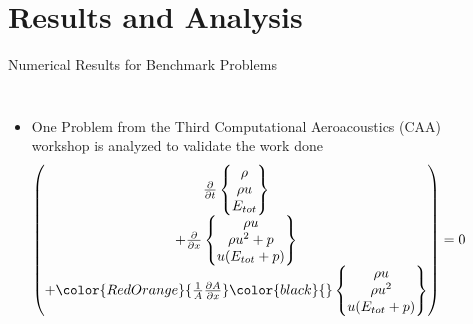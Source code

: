 \section{Results and Analysis}
\begin{frame}{Numerical Results for Benchmark Problems}
  \begin{columns}
      \begin{itemize}
        \item One Problem from the Third Computational Aeroacoustics (CAA) workshop is analyzed
              to validate the work done
        \begin{equation*}
          \left(\begin{matrix}
              \frac{\partial{}}{\partial{t}} 
              \left\{\begin{matrix}
                  \rho \\
                  \rho{u} \\
                  E_{tot}
            \end{matrix}\right\}\\
             +\frac{\partial{}}{\partial{x}}
              \left\{\begin{matrix}
                  \rho{u} \\
                  \rho{u^2}+p \\
                  u(E_{tot}+p)
            \end{matrix}\right\} \\
            +\color{RedOrange}{\frac{1}{A}\frac{\partial{A}}{\partial{x}}}\color{black}{}
              \left\{\begin{matrix}
                  \rho{u} \\
                  \rho{u^2} \\
                  u(E_{tot}+p)
            \end{matrix}\right\}
          \end{matrix}\right)= 0
        \end{equation*} 
      \end{itemize}   
      \begin{figure}[hbt!]
          \centering
          \includegraphics[width=1.0\textwidth]{Figures/Area_dX}

\end{figure}
\end{columns}
\end{frame}
